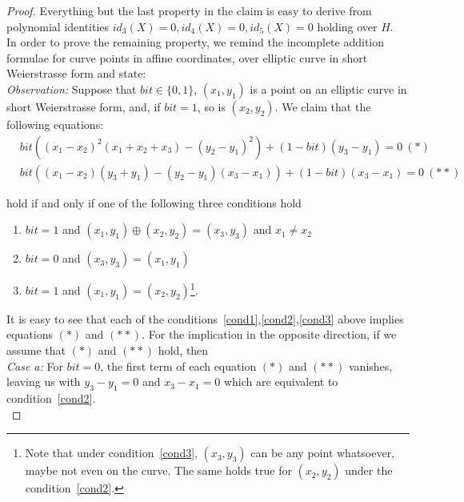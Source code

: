 \begin{proof} Everything but the last property in the claim is easy to derive from polynomial identities 
$id_3(X) =0, id_4(X )= 0, id_5(X) = 0$ holding over $H$. \\

\noindent In order to prove the remaining property, we remind the incomplete addition formulae for curve points in affine 
coordinates, over elliptic curve in short Weierstrasse form and state:\\ 

\noindent \textit{Observation:} Suppose that $\mathit{bit} \in \{0,1\}$, $(x_1,y_1)$ is a point on an elliptic curve in 
short Weierstrasse form, and, if $\mathit{bit} = 1$, so is $(x_2,y_2)$. We claim that the following equations: 
\begin{align*}
&\mathit{bit}((x_1 - x_2)^2 (x_1 + x_2 + x_3) - (y_2 - y_1)^2 ) + (1 - \mathit{bit})(y_3 - y_1) =0 \ (\ast)\\
&\mathit{bit}((x_1 - x_2)(y_3 + y_1) - (y_2 - y_1)(x_3 - x_1)) + (1 - \mathit{bit})(x_3 - x_1) =0 \ (\ast\ast)
\end{align*}

\noindent hold if and only if one of the following three conditions hold 

\begin{enumerate}
\item \label{cond1} $\mathit{bit}=1$ and $(x_1,y_1)\oplus(x_2,y_2)=(x_3,y_3)$ and $x_1 \neq x_2$
\item \label{cond2} $\mathit{bit}=0$ and $(x_3,y_3)=(x_1,y_1)$ 
\item  \label{cond3} $\mathit{bit}=1$ and $(x_1,y_1)=(x_2,y_2)$\footnote{Note that under condition~\ref{cond3}, $(x_3,y_3)$ 
can be any point whatsoever, maybe not even on the curve. The same holds true for $(x_2, y_2)$ under the condition~\ref{cond2}.}.
\end{enumerate}

\noindent It is easy to see that each of the conditions~\ref{cond1},\ref{cond2},\ref{cond3} above implies equations $(\ast)$ and $(\ast \ast)$.
\noindent For the implication in the opposite direction, if we assume that $(\ast)$ and $(\ast \ast)$ hold, then \\

\noindent \textit{Case a:} For $\mathit{bit}=0$, the first term of each equation $(\ast)$ and $(\ast \ast)$ vanishes, 
leaving us with $y_3-y_1=0$ and $x_3-x_1=0$ which are equivalent to condition~\ref{cond2}. \\


\end{proof}
